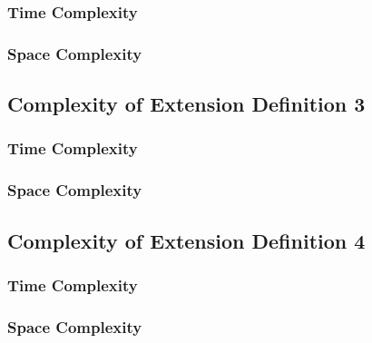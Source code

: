 \documentclass[conference]{IEEEtran}
\begin{document}
\subsubsection{Time Complexity}

\subsubsection{Space Complexity}

\subsection{Complexity of Extension Definition 3}

\subsubsection{Time Complexity}

\subsubsection{Space Complexity}

\subsection{Complexity of Extension Definition 4}

\subsubsection{Time Complexity}

\subsubsection{Space Complexity}

\end{document}

